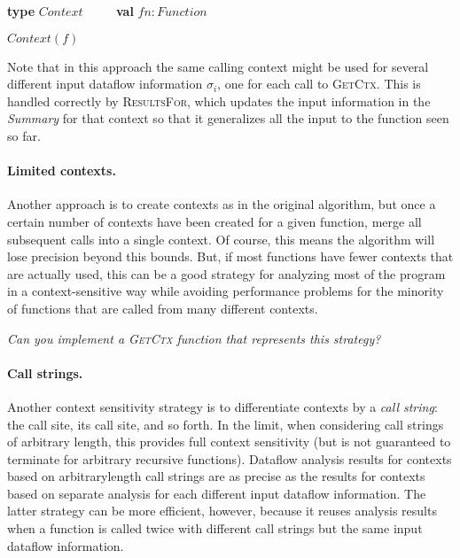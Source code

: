 \documentclass[11pt]{article}
\begin{document}
\begin{algorithmic}
\State \textbf{type} $Context$
\State~~~~ \textbf{val} $fn : Function$
    
\bigskip

    \State \Return $Context(f)$
\EndFunction
\end{algorithmic}

Note that in this approach the same calling context might be used for several different input
dataflow information $\sigma_i$, one for each call to \textsc{GetCtx}. This is handled correctly by \textsc{ResultsFor},
which updates the input information in the \textit{Summary} for that context so that it generalizes all the
input to the function seen so far.

\paragraph{Limited contexts.} Another approach is to create contexts as in the original algorithm, but once a
certain number of contexts have been created for a given function, merge all subsequent calls into a
single context. Of course, this means the algorithm will lose precision beyond this bounds.
But, if most functions have fewer contexts that are actually used, this can
be a good strategy for analyzing most of the program in a context-sensitive way while avoiding
performance problems for the minority of functions that are called from many different contexts.

\vspace{1ex}
\noindent\textit{Can you implement a \textsc{GetCtx} function that represents this strategy?}

\paragraph{Call strings.} Another context sensitivity strategy is to differentiate contexts by a \textit{call string}: the
call site, its call site, and so forth. In the limit, when considering call strings of arbitrary length,
this provides full context sensitivity (but is not guaranteed to terminate for arbitrary recursive functions). Dataflow analysis results for contexts based on arbitrarylength
call strings are as precise as the results for contexts based on separate analysis for each
different input dataflow information. The latter strategy can be more efficient, however, because
it reuses analysis results when a function is called twice with different call strings but the same
input dataflow information.
\end{document}

